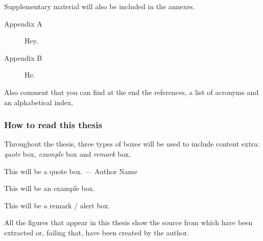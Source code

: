 Supplementary material will also be included in the annexes.

\begin{description}
  \item [Appendix A] Hey. 
  \item [Appendix B] He. 
\end{description}

Also comment that you can find at the end the references, a list of
acronyms and an alphabetical index.

\subsubsection{How to read this thesis}
Throughout the thesis, three types of boxes will be used to include content
extra: \emph{quote} box, \emph{example} box and \emph{remark} box.

\begin{quoteBox}
  This will be a quote box.
  \tcblower
  --- Author Name
\end{quoteBox}

\begin{exampleBox}
  This will be an example box.
\end{exampleBox}

\begin{remarkBox}
  This will be a remark / alert box.
\end{remarkBox}

All the figures that appear in this thesis show the source from which
have been extracted or, failing that, have been created by the author.
